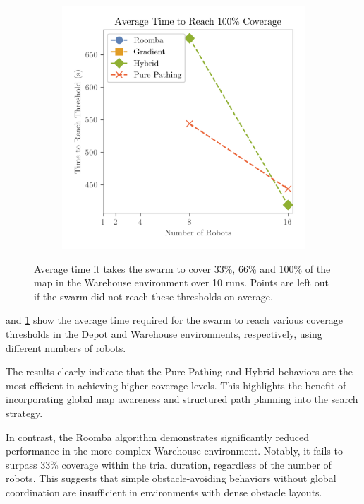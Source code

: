 \begin{figure}[H]
\begin{subfigure}[b]{\w}
    \end{subfigure}
    \begin{subfigure}[b]{\w}
        \centering
        \includegraphics[width=\textwidth]{figures/plots/benchmarks/big-coverage-1.0-warehouse.png}
    \end{subfigure}
    \caption{Average time it takes the swarm to cover 33\%, 66\% and 100\% of the map in the Warehouse environment over 10 runs. Points are left out if the swarm did not reach these thresholds on average.}
    \label{fig:warehouse-threshold}
\end{figure}

 and \cref{fig:warehouse-threshold} show the average time required for the swarm to reach various coverage thresholds in the Depot and Warehouse environments, respectively, using different numbers of robots.

The results clearly indicate that the Pure Pathing and Hybrid behaviors are the most efficient in achieving higher coverage levels. This highlights the benefit of incorporating global map awareness and structured path planning into the search strategy.

In contrast, the Roomba algorithm demonstrates significantly reduced performance in the more complex Warehouse environment. Notably, it fails to surpass 33\% coverage within the trial duration, regardless of the number of robots. This suggests that simple obstacle-avoiding behaviors without global coordination are insufficient in environments with dense obstacle layouts.


